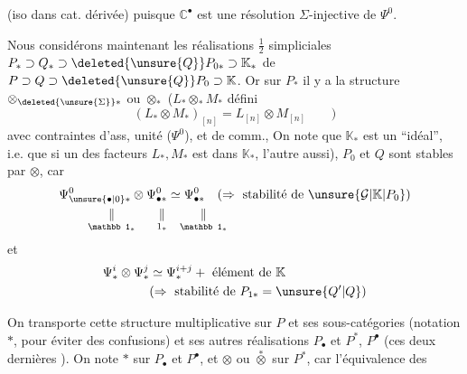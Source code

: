(iso dans cat. dérivée) puisque $\mathbb{C}^{\bullet}$ est une résolution $\Sigma$-injective de $\Psi^0$.


Nous considérons maintenant les réalisations $\frac12$ simpliciales $P_*\supset Q_*\supset \deleted{\unsure{Q}}P_{0*}\supset \mathbb{K}_*$  de $P\supset Q\supset \deleted{\unsure{Q}}P_0\supset\mathbb{K}$. Or sur  $P_*$ il y a la structure $\otimes_{\deleted{\unsure{\Sigma}}*}$ ou $\otimes_*$ ($L_*\otimes_*M_*$ défini 
\[
(L_*\otimes M_*)_{[n]}=L_{[n]}\otimes M_{[n]}\qquad)
\]
avec contraintes d'ass, unité ($\Psi^0$), et de comm.,   On note que $\mathbb{K}_*$ est un ``idéal'', i.e. que   si un des facteurs $L_*,M_*$ est dans $\mathbb{K}_*$, l'autre aussi), $P_0$ et $Q$ sont stables par $\otimes$, car
\[
\begin{aligned}
\Psi^0_{\unsure{\bullet|0}*}\otimes\Psi^0_{\bullet*}&\simeq\Psi^0_{\bullet*}\quad(\Rightarrow\text{ stabilité de }\unsure{\mathcal G|\mathbb{K}|P_0})\\[-.3ex]
\underset{\mathbb 1_*}{\Vert}\hspace{1.7em}\underset{1_*}{\Vert}&\hspace{1em}\underset{\mathbb 1_*}{\Vert}
\end{aligned}
\]
et
\[
\begin{aligned}
\Psi^i_*\otimes\Psi^j_*&\simeq\Psi^{i+j}_*+\text{ élément de }\mathbb{K}\\
&(\Rightarrow\text{ stabilité de }P_{1*}=\unsure{Q'|Q})
\end{aligned}
\]

On transporte cette structure multiplicative sur $P$ et ses sous-catégories (notation $*$, pour éviter des confusions) et ses autres réalisations $P_{\bullet}$ et $P^{*}$, $P^{\bullet}$ (ces deux dernières ). On note $*$ sur $P_{\bullet}$ et $P^{\bullet}$, et $\otimes$ ou $\overset{*}{\otimes}$ sur $P^{*}$, car l'équivalence des
